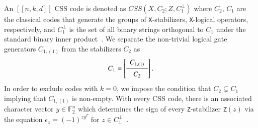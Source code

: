 \documentclass[journal]{IEEEtran}
\newcommand{\X}{\texttt{X}}
\newcommand{\Z}{\texttt{Z}}
\begin{document}
An $[[n,k,d]]$ CSS code is denoted as $CSS(X,C_2;Z,C_1^\perp)$ where $C_2$, $C_1$ are the classical codes that generate the groups of \X-stabilizers, \X-logical operators, respectively, and $C_1^\perp$ is the set of all binary strings orthogonal to \(C_{1}\) under the standard binary inner product~\cite{macwilliams_theory_1977}. We separate the non-trivial logical gate generators $C_{1,(1)}$ from the stabilizers $C_{2}$ as 
\begin{equation}
    C_1 = \left[\begin{array}{c}
   C_{1,(1)}  \\
   \midrule
   C_{2}\\
\end{array}\right] .
\end{equation}
In order to exclude codes with $k=0$, we impose the condition that $C_2 \subsetneq C_1$ implying that $C_{1,(1)}$ is non-empty. With every CSS code, there is an associated character vector $y\in\mathbb{F}_2^{n}$ which determines the sign of every \Z-stabilizer \Z$(z)$ via the equation $\epsilon_z = (-1)^{zy^T}$ for $z\in C_1^\perp$~\cite{hu_designing_2022}.
\end{document}
